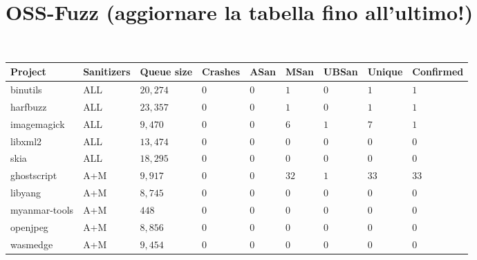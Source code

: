 \newpage
\section{OSS-Fuzz (aggiornare la tabella fino all'ultimo!)}
\ \\
\begin{adjustbox}{width=\textwidth,center}
\begin{tabular}{|l|l|l|l|l|l|l|l|l|}
\hline
\textbf{Project} & \textbf{Sanitizers} & \textbf{Queue size} & \textbf{Crashes} & \textbf{ASan} & \textbf{MSan} & \textbf{UBSan} & \textbf{Unique} & \textbf{Confirmed}  \\ 
\hline
binutils         & ALL                 & $20,274$            & $0$              & $0$           & $1$           & $0$            & $1$             & $1$                 \\
harfbuzz         & ALL                 & $23,357$            & $0$              & $0$           & $1$           & $0$            & $1$             & $1$                 \\
imagemagick      & ALL                 & $9,470$             & $0$              & $0$           & $6$           & $1$            & $7$             & $1$                 \\
libxml2          & ALL                 & $13,474$            & $0$              & $0$           & $0$           & $0$            & $0$             & $0$                 \\
skia             & ALL                 & $18,295$            & $0$              & $0$           & $0$           & $0$            & $0$             & $0$                 \\ 
\hline
ghostscript      & A+M                 & $9,917$             & $0$              & $0$           & $32$          & $1$            & $33$            & $33$                \\
libyang          & A+M                 & $8,745$             & $0$              & $0$           & $0$           & $0$            & $0$             & $0$                 \\
myanmar-tools    & A+M                 & $448$               & $0$              & $0$           & $0$           & $0$            & $0$             & $0$                 \\
openjpeg         & A+M                 & $8,856$             & $0$              & $0$           & $0$           & $0$            & $0$             & $0$                 \\
wasmedge         & A+M                 & $9,454$             & $0$              & $0$           & $0$           & $0$            & $0$             & $0$                 \\ 

\end{tabular}
\end{adjustbox}

